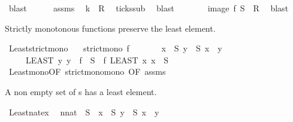 \begin{isabellebody}
\ blast\isanewline
\ \ \ \ \isamarkupfalse%
\ assms\ \isamarkupfalse%
\ {\isacartoucheopen}k\ {\isasymin}\ {\isacharquery}R{\isacartoucheclose}\ \isamarkupfalse%
\ ticks{\isacharunderscore}sub\ \isamarkupfalse%
\ blast\ \isanewline
\ \ \isacommand{{\isacharbraceright}}\isamarkupfalse%
\isanewline
\ \ \isamarkupfalse%
\ {\isacartoucheopen}image\ f\ {\isacharquery}S\ {\isasymsubseteq}\ {\isacharquery}R{\isacartoucheclose}\ \isamarkupfalse%
\ blast\isanewline
{}\isamarkupfalse%
%
\endisatagproof
{\isafoldproof}%
%
\isadelimproof
%
\endisadelimproof
%
\begin{isamarkuptext}%
Strictly monotonous functions preserve the least element.%
\end{isamarkuptext}\isamarkuptrue%
\isamarkupfalse%
\ Least{\isacharunderscore}strict{\isacharunderscore}mono{\isacharcolon}\isanewline
\ \ \ {\isacartoucheopen}strict{\isacharunderscore}mono\ f{\isacartoucheclose}\isanewline
\ \ \ \ \ \ \ {\isacartoucheopen}{\isasymexists}x\ {\isasymin}\ S{\isachardot}\ {\isasymforall}y\ {\isasymin}\ S{\isachardot}\ x\ {\isasymle}\ y{\isacartoucheclose}\isanewline
\ \ \ \ \ {\isacartoucheopen}{\isacharparenleft}LEAST\ y{\isachardot}\ y\ {\isasymin}\ f\ {\isacharbackquote}\ S{\isacharparenright}\ {\isacharequal}\ f\ {\isacharparenleft}LEAST\ x{\isachardot}\ x\ {\isasymin}\ S{\isacharparenright}{\isacartoucheclose}\isanewline
%
\isadelimproof
%
\endisadelimproof
%
\isatagproof
{}\isamarkupfalse%
\ Least{\isacharunderscore}mono{\isacharbrackleft}OF\ strict{\isacharunderscore}mono{\isacharunderscore}mono{\isacharcomma}\ OF\ assms{\isacharbrackright}\ \isacommand{{\isachardot}}\isamarkupfalse%
%
\endisatagproof
{\isafoldproof}%
%
\isadelimproof
%
\endisadelimproof
%
\begin{isamarkuptext}%
A non empty set of s has a least element.%
\end{isamarkuptext}\isamarkuptrue%
\isamarkupfalse%
\ Least{\isacharunderscore}nat{\isacharunderscore}ex{\isacharcolon}\isanewline
\ \ {\isacartoucheopen}{\isacharparenleft}n{\isacharcolon}{\isacharcolon}nat{\isacharparenright}\ {\isasymin}\ S\ {\isasymLongrightarrow}\ {\isasymexists}x\ {\isasymin}\ S{\isachardot}\ {\isacharparenleft}{\isasymforall}y\ {\isasymin}\ S{\isachardot}\ x\ {\isasymle}\ y{\isacharparenright}{\isacartoucheclose}\isanewline
%
\isadelimproof
%
\endisadelimproof
%
\isatagproof

\end{isabellebody}
